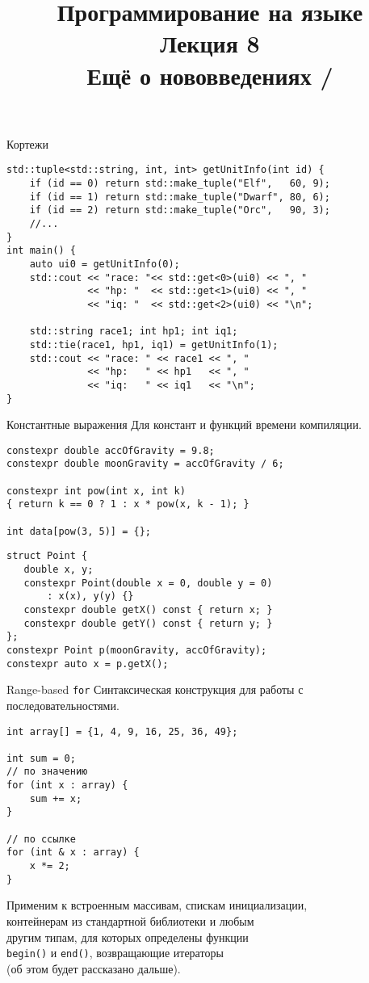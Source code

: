 \documentclass[aspectration=1610,t]{beamer}
\title{{\bf Программирование на языке \langcpp\protect\\Лекция
8\protect\vspace{1em}\\}Ещё о нововведениях \langcpp[11]/\langcpp[14] }
\begin{document}
\begin{frame} 
  \titlepage
\end{frame}

\begin{frame}[fragile]{Кортежи}
\begin{lstlisting}
std::tuple<std::string, int, int> getUnitInfo(int id) {
    if (id == 0) return std::make_tuple("Elf",	 60, 9);
    if (id == 1) return std::make_tuple("Dwarf", 80, 6);
    if (id == 2) return std::make_tuple("Orc", 	 90, 3);
    //...
}
int main() {
    auto ui0 = getUnitInfo(0);
    std::cout << "race: "<< std::get<0>(ui0) << ", "
              << "hp: "  << std::get<1>(ui0) << ", "
              << "iq: "  << std::get<2>(ui0) << "\n";
    
    std::string race1; int hp1; int iq1;
    std::tie(race1, hp1, iq1) = getUnitInfo(1);
    std::cout << "race: " << race1 << ", "
              << "hp:   " << hp1   << ", "
              << "iq:   " << iq1   << "\n";
}
\end{lstlisting}
\end{frame}


\begin{frame}[fragile]{Константные выражения}
Для констант и функций времени компиляции.
\begin{lstlisting}
constexpr double accOfGravity = 9.8;
constexpr double moonGravity = accOfGravity / 6;

constexpr int pow(int x, int k) 
{ return k == 0 ? 1 : x * pow(x, k - 1); }

int data[pow(3, 5)] = {};
\end{lstlisting}

\begin{lstlisting}
struct Point {
   double x, y;
   constexpr Point(double x = 0, double y = 0)
       : x(x), y(y) {}
   constexpr double getX() const { return x; }
   constexpr double getY() const { return y; }
};
constexpr Point p(moonGravity, accOfGravity);
constexpr auto x = p.getX();
\end{lstlisting}
\end{frame}

\begin{frame}[fragile]{Range-based {\tt for}}
Синтаксическая конструкция для работы с последовательностями.
\begin{lstlisting}
int array[] = {1, 4, 9, 16, 25, 36, 49};

int sum = 0;
// по значению
for (int x : array) {
    sum += x;
}

// по ссылке
for (int & x : array) {
    x *= 2;
}
\end{lstlisting}

Применим к встроенным массивам, спискам инициализации,\\ контейнерам из стандартной библиотеки и любым\\ другим типам, для которых определены функции \\ \texttt{begin()} и \texttt{end()}, возвращающие итераторы \\ (об этом будет рассказано дальше).      
\end{frame}
\end{document}
